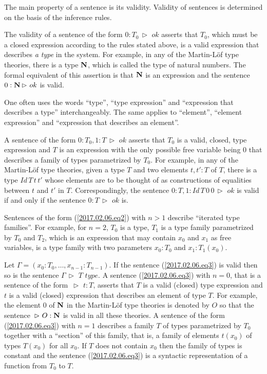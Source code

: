 \documentclass[12pt]{amsart}
\newcommand{\nn}{{\bf N\rm}}
\newcommand{\nat}{\nn}
\newcommand{\rh}{{\,\rhd\,\,}}
\newcommand{\type}{\,\,type}
\begin{document}
The main property of a sentence is its validity. Validity of sentences is determined on the basis of the inference rules. 

The validity of a sentence of the form $0:T_0\rh  ok$ asserts that $T_0$, which must be a closed expression according to the rules stated above, is a valid expression that describes {\em a type} in the system. For example, in any of the Martin-L\"{o}f type theories, there is a type $\nat$, which is called the type of natural numbers. The formal equivalent of this assertion is that $\nat$ is an expression and the sentence $0:\nat\rh  ok$ is valid. 

One often uses the words ``type'', ``type expression'' and ``expression that describes a type'' interchangeably. The same applies to ``element'', ``element expression'' and ``expression that describes an element''. 

A sentence of the form $0:T_0,1:T\rh  ok$ asserts that $T_0$ is a valid, closed, type expression and $T$ is an expression with the only possible free variable being $0$ that describes {a family of types} parametrized by $T_0$. For example, in any of the Martin-L\"{o}f type theories, given a type $T$ and two elements $t,t':T$ of $T$, there is a type $Id\,T\,t\,t'$ whose elements are to be thought of as constructions of equalities between $t$ and $t'$ in $T$. Correspondingly, the sentence $0:T, 1:Id\,T\,0\,0\rh ok$ is valid if and only if the sentence $0:T\rh ok$ is. 

Sentences of the form (\ref{2017.02.06.eq2}) with $n>1$ describe ``iterated type families''. For example, for $n=2$, $T_0$ is a type, $T_1$ is a type family parametrized by $T_0$ and $T_2$, which is an expression that may contain $x_0$ and $x_1$ as free variables, is a type family with two parameters $x_0:T_0$ and $x_1:T_1(x_0)$. 

Let $\Gamma=(x_0:T_0,\dots,x_{n-1}:T_{n-1})$. If the sentence (\ref{2017.02.06.eq3}) is valid then so is the sentence $\Gamma\rh T\type$. A sentence (\ref{2017.02.06.eq3}) with $n=0$, that is a sentence of the form $\rh  t:T$, asserts that $T$ is a valid (closed) type expression and $t$ is a valid (closed) expression that describes an element of type $T$. For example, the element $0$ of $\nat$ in the Martin-L\"{o}f type theories is denoted by $O$ so that the sentence $\rh O:\nat$ is valid in all these theories. A sentence of the form (\ref{2017.02.06.eq3}) with $n=1$ describes a family $T$ of types parametrized by $T_0$ together with a ``section'' of this family, that is, a family of elements $t(x_0)$ of types $T(x_0)$ for all $x_0$. If $T$ does not contain $x_0$ then the family of types is constant and the sentence (\ref{2017.02.06.eq3}) is a syntactic representation of a function from $T_0$ to $T$. 
\end{document}
